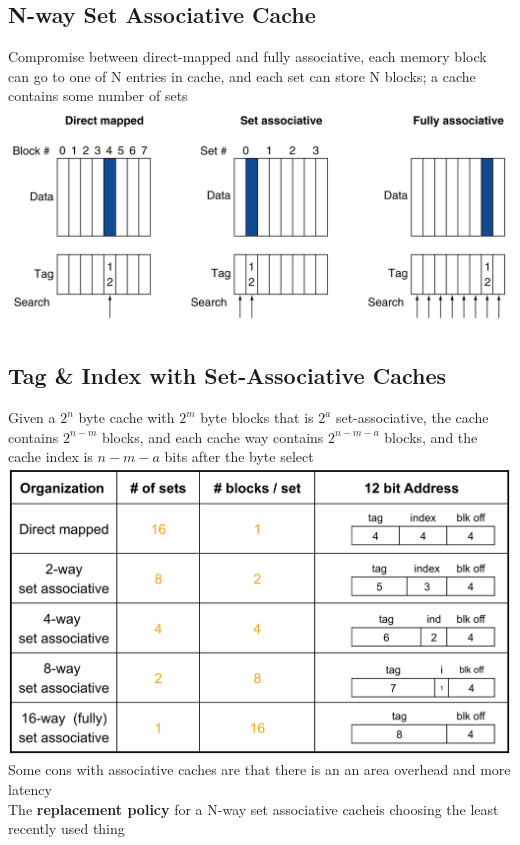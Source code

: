 \subsection*{N-way Set Associative Cache}
Compromise between direct-mapped and fully associative, each memory block can go
 to one of N entries in cache, and each set can store N blocks; a cache contains
 some number of sets
\includegraphics[width=\linewidth]{png/nway.png}

\subsection*{Tag \& Index with Set-Associative Caches}
Given a $2^n$ byte cache with $2^m$ byte blocks that is $2^a$ set-associative,
the cache contains $2^{n-m}$ blocks, and each cache way contains $2^{n-m-a}$ blocks,
and the cache index is $n-m-a$ bits after the byte select \\

\includegraphics[width=\linewidth]{png/ex.png}
Some cons with associative caches are that there is an an area overhead and more latency \\
The \textbf{replacement policy} for a N-way set associative cacheis choosing the least recently used thing

